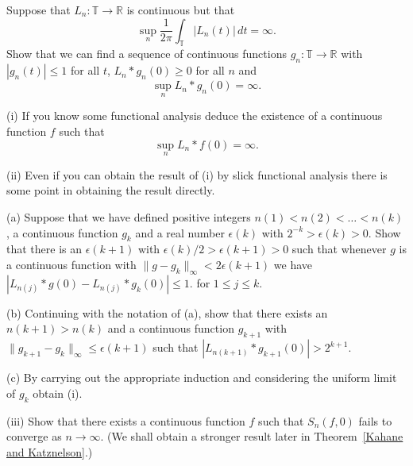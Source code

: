 \begin{exercise} Suppose that
$L_{n}:{\mathbb T}\rightarrow{\mathbb R}$
is continuous but that
\[\sup_{n}\frac{1}{2\pi}
\int_{\mathbb T}|L_{n}(t)|\, dt=\infty.\]
Show that we can find a sequence of continuous functions
$g_{n}:{\mathbb T}\rightarrow{\mathbb R}$ with
$|g_{n}(t)|\leq 1$ for all $t$, $L_{n}*g_{n}(0)\geq 0$
for all $n$ and
\[\sup_{n}L_{n}*g_{n}(0)=\infty.\]

(i) If you know some functional analysis deduce the
existence of a continuous function $f$ such that
\[\sup_{n}L_{n}*f(0)=\infty.\]

(ii) Even if you can obtain the result of (i) by
slick functional analysis there is some point
in obtaining the result directly.

(a) Suppose that we have defined positive integers
$n(1)<n(2)<\dots<n(k)$, a continuous function
$g_{k}$ and a real number $\epsilon(k)$ with
$2^{-k}>\epsilon(k)>0$.
Show that there is an $\epsilon(k+1)$ with
$\epsilon(k)/2>\epsilon(k+1)>0$ such that
whenever $g$ is a continuous function with
$\|g-g_{k}\|_{\infty}<2\epsilon(k+1)$
we have $|L_{n(j)}*g(0)-L_{n(j)}*g_{k}(0)|\leq 1$.
for $1\leq j\leq k$.

(b) Continuing with the notation of (a), show that
there exists an $n(k+1)>n(k)$ and a continuous
function $g_{k+1}$ with $\|g_{k+1}-g_{k}\|_{\infty}\leq\epsilon(k+1)$
such that $|L_{n(k+1)}*g_{k+1}(0)|>2^{k+1}$.

(c) By carrying out the appropriate induction
and considering the uniform limit of $g_{k}$
obtain (i).


(iii) Show that there exists a continuous function
$f$ such that $S_{n}(f,0)$ fails to converge as
$n\rightarrow\infty$. (We shall obtain a stronger result
later in Theorem~\ref{Kahane and Katznelson}.)
\end{exercise}

